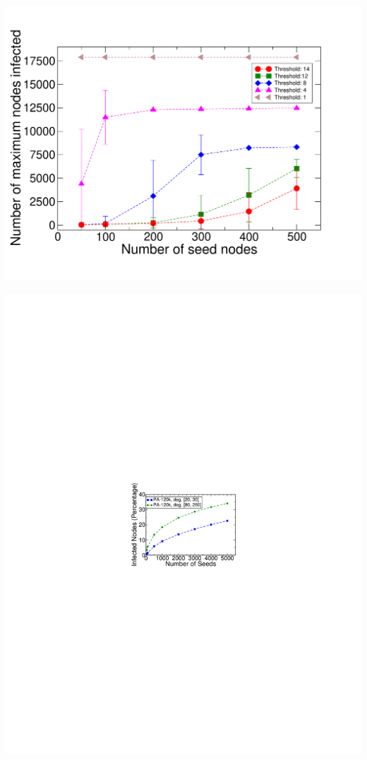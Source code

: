 \documentclass[landscape,paperwidth=70in,paperheight=46in,fontscale=0.225]{baposter} %
\begin{document}
\begin{poster}
{\begin{minipage}{0.5\linewidth}
\centering
\includegraphics[scale=0.16]{figures/astroph_threshold_cs.pdf} 
\end{minipage}
\hfill
\begin{minipage}{0.5\linewidth}
\centering
\includegraphics[scale=0.6]{figures/clustering_seed.pdf} 

\end{minipage}}
\end{poster}
\end{document}
